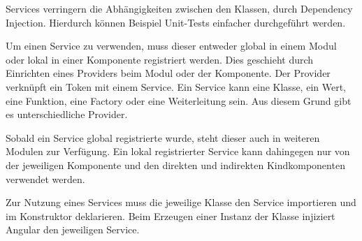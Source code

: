 Services verringern die Abhängigkeiten zwischen den Klassen, durch Dependency Injection. Hierdurch können Beispiel Unit-Tests einfacher durchgeführt werden. \autocite[vgl.][469]{Freeman.2018} 

Um einen Service zu verwenden, muss dieser entweder global in einem Modul oder lokal in einer Komponente registriert werden. Dies geschieht durch Einrichten eines Providers beim Modul oder der Komponente. Der Provider verknüpft ein Token mit einem Service. Ein Service kann eine Klasse, ein Wert, eine Funktion, eine Factory oder eine Weiterleitung sein. Aus diesem Grund gibt es unterschiedliche Provider.

Sobald ein Service global registrierte wurde, steht dieser auch in weiteren Modulen zur Verfügung. Ein lokal registrierter Service kann dahingegen nur von der jeweiligen Komponente und den direkten und indirekten Kindkomponenten verwendet werden. 

Zur Nutzung eines Services muss die jeweilige Klasse den Service importieren und im Konstruktor deklarieren. Beim Erzeugen einer Instanz der Klasse injiziert Angular den jeweiligen Service.\autocites[vgl.][92\psqq]{Steyer.2017}[vgl.][474\psqq]{Freeman.2018}